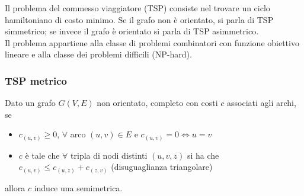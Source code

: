 Il problema del commesso viaggiatore (TSP) consiste nel trovare un ciclo hamiltoniano di costo minimo. Se il grafo non è orientato, si parla di TSP simmetrico; se invece il grafo è orientato si parla di TSP asimmetrico.\\

Il problema appartiene alla classe di problemi combinatori con funzione obiettivo lineare e alla classe dei problemi difficili (NP-hard).

\subsubsection{TSP metrico}
Dato un grafo $G(V,E)$ non orientato, completo con costi $c$ associati agli archi, se 
\begin{itemize}
    \item $c_{(u,v)} \geq 0$, $\forall$ arco $(u,v) \in E$	e	$c_{(u,v)} = 0 \iff u=v$
    \item $c$ è tale che $\forall$ tripla di nodi distinti $(u,v,z)$ si ha che $c_{(u,v)} \leq c_{(u,z)} + c_{(z,v)}$ (disuguaglianza triangolare)
\end{itemize}
allora $c$ induce una semimetrica.

